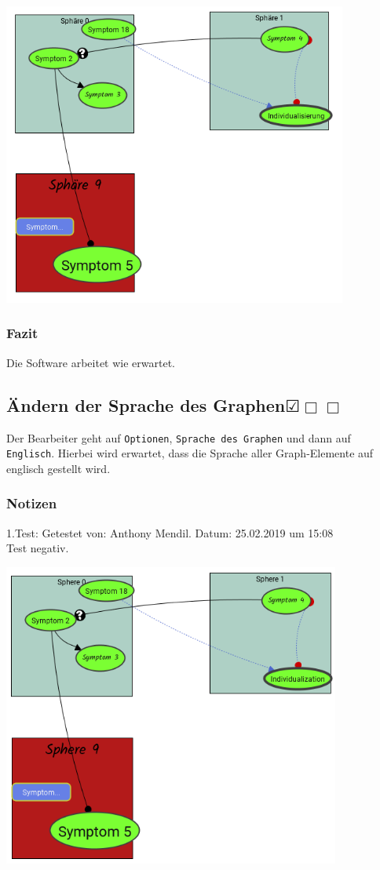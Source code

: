 \documentclass{scrartcl}
\newcommand{\subsectiont}[2]{\subsection[#1]{#1{\normalsize\normalfont #2}}}
\newcommand{\leer}{$\Box$}
\newcommand{\ok}{$\CheckedBox$}
\begin{document}
\begin{center}
\includegraphics[height=10cm]{3_44speichern.PNG}
\end{center}
\subsubsection{Fazit}
Die Software arbeitet wie erwartet.

\subsectiont{Ändern der Sprache des Graphen}{\dotfill\ok\leer\leer}
Der Bearbeiter geht auf \texttt{Optionen}, \texttt{Sprache des Graphen} und dann auf \texttt{Englisch}. Hierbei wird erwartet, dass die Sprache aller Graph-Elemente auf englisch gestellt wird.
\subsubsection{Notizen}
1.Test: Getestet von: Anthony Mendil. Datum: 25.02.2019 um 15:08 \\
Test negativ. 
\begin{center}
\includegraphics[height=10cm]{3_45.PNG}
\end{center}
\end{document}
